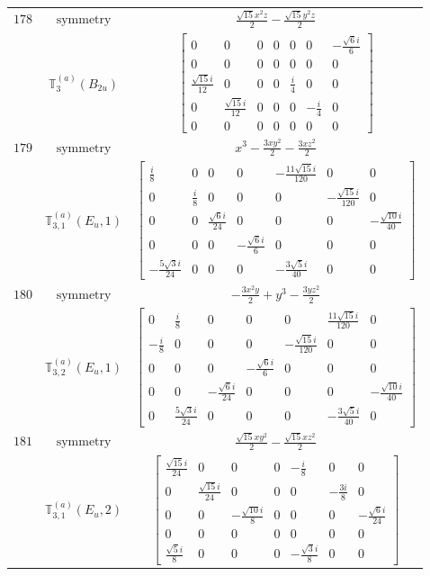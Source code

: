 \documentclass[fleqn,8pt,landscape]{jsarticle}
\begin{document}
\begin{longtable}{ccc}
$ 178 $ & $ \text{symmetry} $ & $ \frac{\sqrt{15} x^{2} z}{2} - \frac{\sqrt{15} y^{2} z}{2} $ \\
$  $ & $ \mathbb{T}_{3}^{(a)}(B_{2u}) $ & $ \begin{bmatrix} 0 & 0 & 0 & 0 & 0 & 0 & - \frac{\sqrt{6} i}{6} \\ 0 & 0 & 0 & 0 & 0 & 0 & 0 \\ \frac{\sqrt{15} i}{12} & 0 & 0 & 0 & \frac{i}{4} & 0 & 0 \\ 0 & \frac{\sqrt{15} i}{12} & 0 & 0 & 0 & - \frac{i}{4} & 0 \\ 0 & 0 & 0 & 0 & 0 & 0 & 0 \end{bmatrix} $ \\ \hline
$ 179 $ & $ \text{symmetry} $ & $ x^{3} - \frac{3 x y^{2}}{2} - \frac{3 x z^{2}}{2} $ \\
$  $ & $ \mathbb{T}_{3,1}^{(a)}(E_{u},1) $ & $ \begin{bmatrix} \frac{i}{8} & 0 & 0 & 0 & - \frac{11 \sqrt{15} i}{120} & 0 & 0 \\ 0 & \frac{i}{8} & 0 & 0 & 0 & - \frac{\sqrt{15} i}{120} & 0 \\ 0 & 0 & \frac{\sqrt{6} i}{24} & 0 & 0 & 0 & - \frac{\sqrt{10} i}{40} \\ 0 & 0 & 0 & - \frac{\sqrt{6} i}{6} & 0 & 0 & 0 \\ - \frac{5 \sqrt{3} i}{24} & 0 & 0 & 0 & - \frac{3 \sqrt{5} i}{40} & 0 & 0 \end{bmatrix} $ \\ \hline
$ 180 $ & $ \text{symmetry} $ & $ - \frac{3 x^{2} y}{2} + y^{3} - \frac{3 y z^{2}}{2} $ \\
$  $ & $ \mathbb{T}_{3,2}^{(a)}(E_{u},1) $ & $ \begin{bmatrix} 0 & \frac{i}{8} & 0 & 0 & 0 & \frac{11 \sqrt{15} i}{120} & 0 \\ - \frac{i}{8} & 0 & 0 & 0 & - \frac{\sqrt{15} i}{120} & 0 & 0 \\ 0 & 0 & 0 & - \frac{\sqrt{6} i}{6} & 0 & 0 & 0 \\ 0 & 0 & - \frac{\sqrt{6} i}{24} & 0 & 0 & 0 & - \frac{\sqrt{10} i}{40} \\ 0 & \frac{5 \sqrt{3} i}{24} & 0 & 0 & 0 & - \frac{3 \sqrt{5} i}{40} & 0 \end{bmatrix} $ \\ \hline
$ 181 $ & $ \text{symmetry} $ & $ \frac{\sqrt{15} x y^{2}}{2} - \frac{\sqrt{15} x z^{2}}{2} $ \\
$  $ & $ \mathbb{T}_{3,1}^{(a)}(E_{u},2) $ & $ \begin{bmatrix} \frac{\sqrt{15} i}{24} & 0 & 0 & 0 & - \frac{i}{8} & 0 & 0 \\ 0 & \frac{\sqrt{15} i}{24} & 0 & 0 & 0 & - \frac{3 i}{8} & 0 \\ 0 & 0 & - \frac{\sqrt{10} i}{8} & 0 & 0 & 0 & - \frac{\sqrt{6} i}{24} \\ 0 & 0 & 0 & 0 & 0 & 0 & 0 \\ \frac{\sqrt{5} i}{8} & 0 & 0 & 0 & - \frac{\sqrt{3} i}{8} & 0 & 0 \end{bmatrix} $ \\ \hline

\end{longtable}
\end{document}
